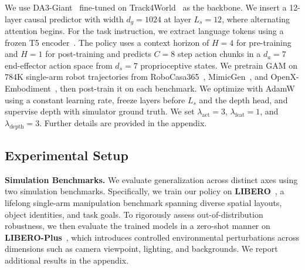 \documentclass{llmxive}
\providecommand{\drop}[1]{{\scriptsize\,($\downarrow$#1)}}
\begin{document}
We use DA3-Giant~\citep{lin2025depth} fine-tuned on Track4World~\citep{lu2026track4world} as the backbone. We insert a 12-layer causal predictor with width $d_g=1024$ at layer $L_s=12$, where alternating attention begins. For the task instruction, we extract language tokens using a frozen T5 encoder~\citep{raffel2020exploring}. The policy uses a context horizon of $H=4$ for pre-training and $H=1$ for post-training and predicts $C=8$ step action chunks in a $d_a=7$ end-effector action space from $d_s=7$ proprioceptive states. We pretrain GAM on 784K single-arm robot trajectories from RoboCasa365~\citep{nasiriany2026robocasa365}, MimicGen~\citep{mandlekar2023mimicgen}, and OpenX-Embodiment~\citep{collaboration2023open}, then post-train it on each benchmark. We optimize with AdamW using a constant learning rate, freeze layers before $L_s$ and the depth head, and supervise depth with simulator ground truth. We set $\lambda_{\text{act}}=3$, $\lambda_{\text{feat}}=1$, and $\lambda_{\text{depth}}=3$. Further details are provided in the appendix.


\subsection{Experimental Setup}
\label{sec:exp:setup}


\noindent\textbf{Simulation Benchmarks.}
We evaluate generalization across distinct axes using two simulation benchmarks. Specifically, we train our policy on \textbf{LIBERO}~\citep{liu2023libero}, a lifelong single-arm manipulation benchmark spanning diverse spatial layouts, object identities, and task goals. To rigorously assess out-of-distribution robustness, we then evaluate the trained models in a zero-shot manner on \textbf{LIBERO-Plus}~\citep{fei2025libero}, which introduces controlled environmental perturbations across dimensions such as camera viewpoint, lighting, and backgrounds. We report additional results in the appendix.



\renewcommand{\drop}[1]{{\scriptsize\,($\downarrow$#1)}}
\end{document}
